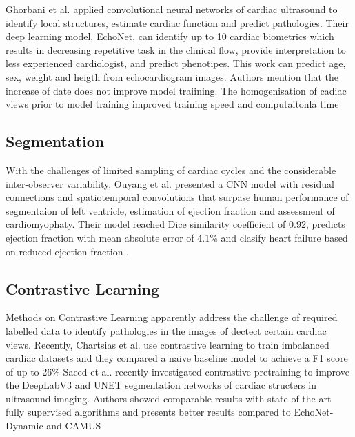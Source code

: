 Ghorbani et al. applied convolutional neural networks of cardiac ultrasound to identify local structures, estimate cardiac function and predict pathologies.
Their deep learning model, EchoNet, can identify up to 10 cardiac biometrics which results in decreasing repetitive task in the clinical flow, provide interpretation to less experienced cardiologist, and predict phenotipes. This work can predict age, sex, weight and heigth from echocardiogram images. 
Authors mention that the increase of date does not improve model traiining. The homogenisation of cadiac views prior to model training improved training speed and computaitonla time
\cite{Ghorbani-DigitalMedicineNature-JAN2020}


\subsection{Segmentation}
With the challenges of limited sampling of cardiac cycles and the considerable inter-observer variability, Ouyang et al. presented a CNN model with residual connections and spatiotemporal convolutions that surpase human performance of segmentaion of left ventricle, estimation of ejection fraction and assessment of cardiomyophaty. 
Their model reached Dice similarity coefficient of 0.92, predicts ejection fraction with mean absolute error of 4.1\% and clasify heart failure based on reduced ejection fraction 
\cite{Ouyang-Nature-APR2020}.


\subsection{Contrastive Learning}
Methods on Contrastive Learning apparently address the challenge of required labelled data to identify pathologies in the images of dectect certain cardiac views.
Recently, Chartsias et al. use contrastive learning to train imbalanced cardiac datasets and they compared a naive baseline model to achieve a F1 score of up to 26\% \cite{chartsias2021-ASMUS}
Saeed et al. recently investigated contrastive pretraining to improve the DeepLabV3 and UNET segmentation networks of cardiac structers in ultrasound imaging.
Authors showed comparable results with state-of-the-art fully supervised algorithms and presents better results compared to EchoNet-Dynamic and CAMUS \cite{saeed2021MIDL}





